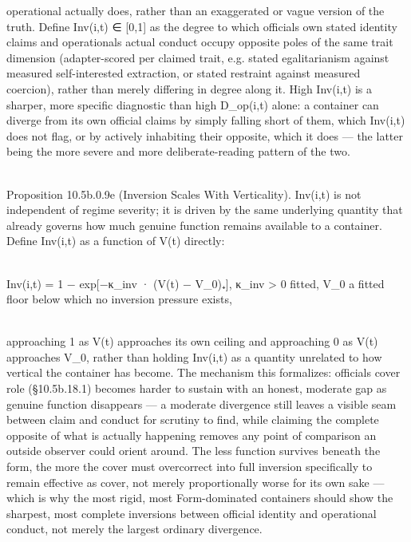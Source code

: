 \documentclass[
]{article}
\begin{document}
operational actually does, rather than an exaggerated or vague version
of the truth. Define Inv(i,t) ∈ {[}0,1{]} as the degree to which
official\textquotesingle s own stated identity claims and
operational\textquotesingle s actual conduct occupy opposite poles of
the same trait dimension (adapter-scored per claimed trait, e.g. stated
egalitarianism against measured self-interested extraction, or stated
restraint against measured coercion), rather than merely differing in
degree along it. High Inv(i,t) is a sharper, more specific diagnostic
than high D\_op(i,t) alone: a container can diverge from its own
official claims by simply falling short of them, which Inv(i,t) does not
flag, or by actively inhabiting their opposite, which it does --- the
latter being the more severe and more deliberate-reading pattern of the
two.\\
\strut \\
Proposition 10.5b.0.9e (Inversion Scales With Verticality). Inv(i,t) is
not independent of regime severity; it is driven by the same underlying
quantity that already governs how much genuine function remains
available to a container. Define Inv(i,t) as a function of V(t)
directly:\\
\strut \\
Inv(i,t) = 1 − exp{[}−κ\_inv · (V(t) − V\_0)₊{]}, κ\_inv \textgreater{}
0 fitted, V\_0 a fitted floor below which no inversion pressure
exists,\\
\strut \\
approaching 1 as V(t) approaches its own ceiling and approaching 0 as
V(t) approaches V\_0, rather than holding Inv(i,t) as a quantity
unrelated to how vertical the container has become. The mechanism this
formalizes: official\textquotesingle s cover role (§10.5b.18.1) becomes
harder to sustain with an honest, moderate gap as genuine function
disappears --- a moderate divergence still leaves a visible seam between
claim and conduct for scrutiny to find, while claiming the complete
opposite of what is actually happening removes any point of comparison
an outside observer could orient around. The less function survives
beneath the form, the more the cover must overcorrect into full
inversion specifically to remain effective as cover, not merely
proportionally worse for its own sake --- which is why the most rigid,
most Form-dominated containers should show the sharpest, most complete
inversions between official identity and operational conduct, not merely
the largest ordinary divergence.
\end{document}

